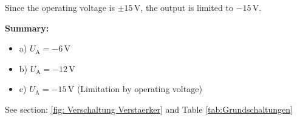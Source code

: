 {Since the operating voltage is $\pm 15\,\mathrm{V}$, the output is limited to $-15\,\mathrm{V}$.


\textbf{Summary:}
\begin{itemize}
    \item a) $U_\mathrm{A} = -6\,\mathrm{V}$
    \item b) $U_\mathrm{A} = -12\,\mathrm{V}$
    \item c) $U_\mathrm{A} = -15\,\mathrm{V}$ (Limitation by operating voltage)
\end{itemize}

  See section: \ref{fig: Verschaltung Verstaerker} and Table \ref{tab:Grundschaltungen}
    
}
